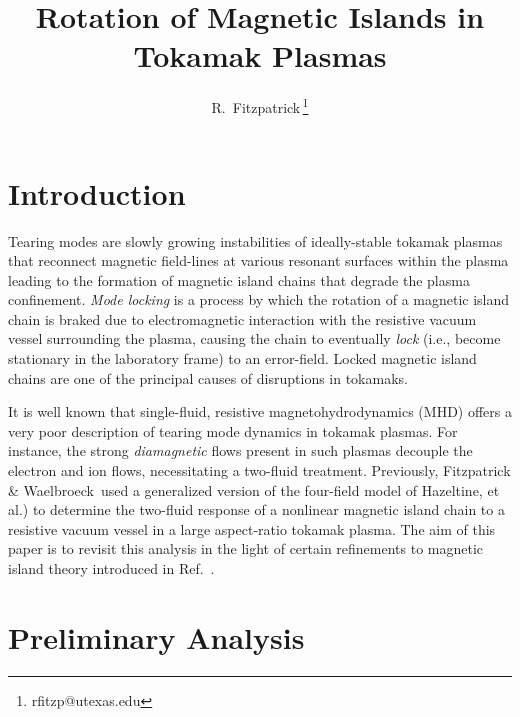 \documentclass[12pt,prb,aps]{revtex4-1}
\begin{document}
\title{Rotation of Magnetic Islands in Tokamak Plasmas}

\author{R.~Fitzpatrick\,\footnote{rfitzp@utexas.edu}}

\begin{abstract}
\end{abstract}

\maketitle

\section{Introduction}
Tearing modes are slowly growing instabilities of ideally-stable tokamak plasmas that reconnect magnetic field-lines
at various resonant surfaces within the plasma leading to the formation of magnetic island chains that degrade the plasma confinement.\cite{wes} {\em Mode locking}\/ is a process by which the rotation of a magnetic island chain is braked  due to electromagnetic interaction with the resistive 
vacuum vessel surrounding the plasma, causing the chain to eventually {\em lock}\/ (i.e., become stationary in the laboratory frame) to an error-field.\cite{nave}
 Locked magnetic island chains are one of the principal causes of disruptions in tokamaks.\cite{vries}
 
It is well known that single-fluid, resistive magnetohydrodynamics (MHD) offers a very poor description of
tearing mode dynamics in tokamak plasmas. 
For instance, the strong {\em diamagnetic}\/ flows present in such plasmas decouple the electron and ion flows,
necessitating a two-fluid treatment.\cite{ara} Previously, Fitzpatrick \& Waelbroeck\,\cite{fw,fw1} used a generalized version of the four-field model of Hazeltine, et al.\cite{haz})
to determine the two-fluid response of a nonlinear magnetic island chain to a resistive vacuum vessel  in a large aspect-ratio tokamak plasma. The aim of this paper is to revisit this analysis in the light of certain refinements to magnetic island theory
introduced in Ref.~. 

\section{Preliminary Analysis}\label{sect1}
\end{document}
